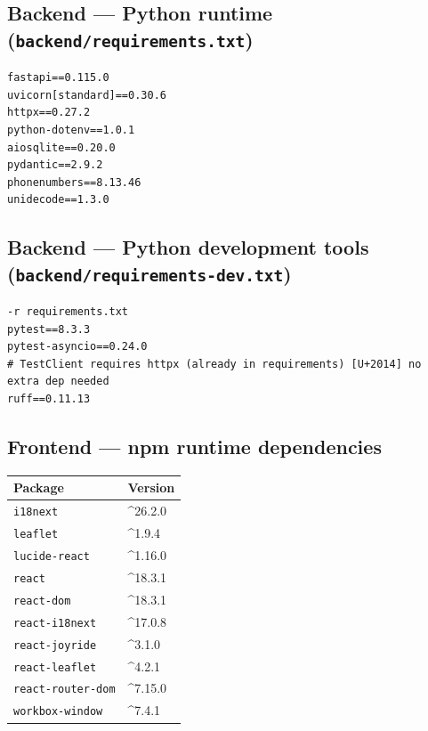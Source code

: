 \documentclass[11pt, a4paper]{article}
\newcommand{\file}[1]{\texttt{\small\color{rsblue}#1}}
\newcommand{\code}[1]{\texttt{\small#1}}
\begin{document}
\subsection{Backend --- Python runtime (\file{backend/requirements.txt})}

\begin{lstlisting}[breaklines=true,postbreak=\mbox{\textcolor{gray}{$\hookrightarrow$\space}}]
fastapi==0.115.0
uvicorn[standard]==0.30.6
httpx==0.27.2
python-dotenv==1.0.1
aiosqlite==0.20.0
pydantic==2.9.2
phonenumbers==8.13.46
unidecode==1.3.0\end{lstlisting}

\subsection{Backend --- Python development tools (\file{backend/requirements-dev.txt})}
\begin{lstlisting}[breaklines=true,postbreak=\mbox{\textcolor{gray}{$\hookrightarrow$\space}}]
-r requirements.txt
pytest==8.3.3
pytest-asyncio==0.24.0
# TestClient requires httpx (already in requirements) [U+2014] no extra dep needed
ruff==0.11.13
\end{lstlisting}

\subsection{Frontend --- npm runtime dependencies}
\begin{tabular}{ll}
\toprule
\textbf{Package} & \textbf{Version} \\
\midrule
  \code{i18next} & \textasciicircum{}26.2.0 \\
  \code{leaflet} & \textasciicircum{}1.9.4 \\
  \code{lucide-react} & \textasciicircum{}1.16.0 \\
  \code{react} & \textasciicircum{}18.3.1 \\
  \code{react-dom} & \textasciicircum{}18.3.1 \\
  \code{react-i18next} & \textasciicircum{}17.0.8 \\
  \code{react-joyride} & \textasciicircum{}3.1.0 \\
  \code{react-leaflet} & \textasciicircum{}4.2.1 \\
  \code{react-router-dom} & \textasciicircum{}7.15.0 \\
  \code{workbox-window} & \textasciicircum{}7.4.1 \\
\bottomrule
\end{tabular}
\end{document}
